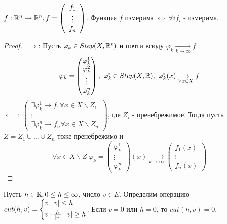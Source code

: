 \begin{theorem*}
    $f:\mathbb{R}^n \to \mathbb{R}^n, f = \left(\begin{array}{c} f_1 \\ \vdots \\ f_n \end{array} \right)$. Функция $f$ измерима $\iff \ \forall i f_i$ - измерима.
    \begin{proof}
        $\implies$:\newline
        Пусть $\varphi_k \in Step(X, \mathbb{R}^n)$ и почти всюду $ \varphi_k \underset{k \to \infty}{\to} f$. 
        \[\varphi_k = \begin{pmatrix}
            \varphi_k^1 \\ \varphi_k^2 \\ \vdots \\ \varphi_k^n
        \end{pmatrix}, \ \varphi_k^i \in Step(X, \mathbb{R}), \ \varphi_k^i (x) \underset{\vee x \in X}{\to} f\]
        $\impliedby$:\newline
        $\begin{pmatrix}
            \exists \varphi_k^1 \to f_1 \forall x \in X\backslash Z_1 \\
            \vdots \\
            \exists \varphi_k^n \to f_n \forall x \in X\backslash Z_n 
        \end{pmatrix}$, где $Z_i$ - пренебрежимое. Тогда пусть $Z = Z_1 \cup \hdots \cup Z_n$ тоже пренебрежимо и 
        \[\forall x \in X \backslash Z \ \varphi_k = \begin{pmatrix}
            \varphi_k^1 \\ \vdots \\ \varphi_k^n
        \end{pmatrix}(x) \underset{k \to \infty}{\to} \begin{pmatrix}
            f_1(x) \\ \vdots \\ f_n(x)
        \end{pmatrix}\]
    \end{proof}
\end{theorem*}

\begin{definition*}[Срезка]
    Пусть $h \in \mathbb{R},  0 \le h \le \infty$, число $v \in E$. \newline Определим операцию $cut(h, v) = \begin{cases*}
        v \ \abs{v} \le h \\
        v\cdot \frac{h}{\abs{v}} \ \abs{v} \ge h
    \end{cases*}$. Если $v = 0$ или $h = 0$, то $cut(h, v) = 0$.
\end{definition*}


